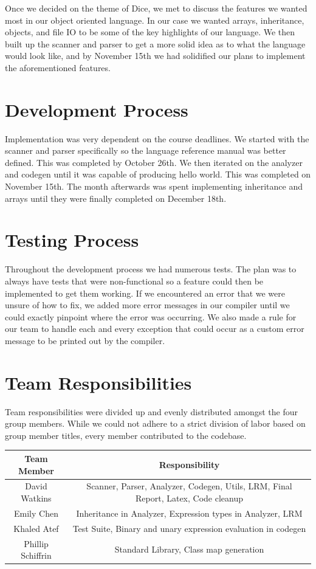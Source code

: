 \begin{homeworkProblem}
	Once we decided on the theme of Dice, we met to discuss the features we wanted most in our object oriented language. In our case we wanted arrays, inheritance, objects, and file IO to be some of the key highlights of our language. We then built up the scanner and parser to get a more solid idea as to what the language would look like, and by November 15th we had solidified our plans to implement the aforementioned features. 
	
	\section{Development Process}
	Implementation was very dependent on the course deadlines. We started with the scanner and parser specifically so the language reference manual was better defined. This was completed by October 26th. We then iterated on the analyzer and codegen until it was capable of producing hello world. This was completed on November 15th. The month afterwards was spent implementing inheritance and arrays until they were finally completed on December 18th. 
	
	\section{Testing Process}
	Throughout the development process we had numerous tests. The plan was to always have tests that were non-functional so a feature could then be implemented to get them working. If we encountered an error that we were unsure of how to fix, we added more error messages in our compiler until we could exactly pinpoint where the error was occurring. We also made a rule for our team to handle each and every exception that could occur as a custom error message to be printed out by the compiler. 
	
	\section{Team Responsibilities}
	Team responsibilities were divided up and evenly distributed amongst the four group members. While we could not adhere to a strict division of labor based on group member titles, every member contributed to the codebase. \\
	
	\begin{tabular}{|c|c|}
		\hline
		Team Member & Responsibility \\
		\hline
		David Watkins & Scanner, Parser, Analyzer, Codegen, Utils, LRM, Final Report, Latex, Code cleanup\\
		\hline
		Emily Chen & Inheritance in Analyzer, Expression types in Analyzer, LRM\\
		\hline
		Khaled Atef & Test Suite, Binary and unary expression evaluation in codegen\\
		\hline
		Phillip Schiffrin & Standard Library, Class map generation \\
		\hline
	\end{tabular}
	

\end{homeworkProblem}
